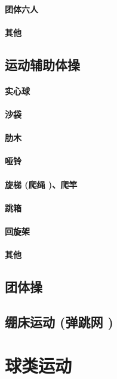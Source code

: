 \documentclass[UTF8]{../../ApplicationUniverse}
\begin{document}
        \subsubsection{团体六人}
        \subsubsection{其他}
\section{运动辅助体操}
    \subsubsection{实心球}
    \subsubsection{沙袋}
    \subsubsection{肋木}
    \subsubsection{哑铃}
    \subsubsection{旋梯 (爬绳 )、爬竿}
    \subsubsection{跳箱}
    \subsubsection{回旋架}
    \subsubsection{其他}
\section{团体操}
\section{绷床运动 (弹跳网 )}







\chapter{球类运动}
\end{document}
